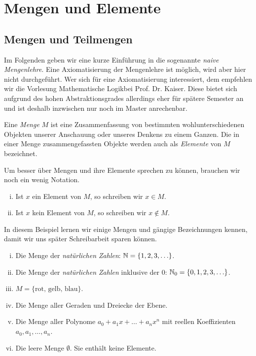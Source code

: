 \chapter{Mengen und Elemente}

\section{Mengen und Teilmengen}
Im Folgenden geben wir eine kurze Einführung in die sogenannte
\textit{naive Mengenlehre}.
Eine Axiomatisierung der Mengenlehre ist möglich, wird aber hier nicht
durchgeführt.
Wer sich für eine Axiomatisierung interessiert, dem empfehlen wir die Vorlesung
\glqq Mathematische Logik\grqq bei Prof. Dr. Kaiser.
Diese bietet sich aufgrund des hohen Abstraktionsgrades allerdings eher für
spätere Semester an und ist deshalb inzwischen nur noch im Master anrechenbar.


\begin{mydef}
Eine \textit{Menge} $M$ ist eine Zusammenfassung von bestimmten
wohlunterschiedenen Objekten unserer Anschauung oder unseres Denkens zu einem
Ganzen.
Die in einer Menge zusammengefassten Objekte werden auch als \textit{Elemente}
von $M$ bezeichnet.
\end{mydef}


\begin{remark}
Um besser über Mengen und ihre Elemente sprechen zu können, brauchen wir noch
ein wenig Notation.

\begin{enumerate}[(i)]
\item Ist $x$ ein Element von $M$, so schreiben wir $x \in M$.
\item Ist $x$ kein Element von $M$, so schreiben wir $x \notin M$.
\end{enumerate}
\end{remark}


\begin{example}
In diesem Beispiel lernen wir einige Mengen und gängige Bezeichnungen kennen,
damit wir uns später Schreibarbeit sparen können.

\begin{enumerate}[(i)]
\item Die Menge der \textit{natürlichen Zahlen}: $\mathbb{N} = \{1,2,3,\ldots\}$.
\item Die Menge der \textit{natürlichen Zahlen} inklusive der $0$:
$\mathbb{N}_0 = \{0,1,2,3,\ldots\}$.
\item $M = \{ \text{rot, gelb, blau} \}$.
\item Die Menge aller Geraden und Dreiecke der Ebene.
\item Die Menge aller Polynome $a_0 + a_1 x + \ldots + a_n x^n$ mit reellen
Koeffizienten $a_0,a_1,\ldots,a_n$.
\item Die leere Menge $\emptyset$. Sie enthält keine Elemente.
\end{enumerate}
\end{example}


